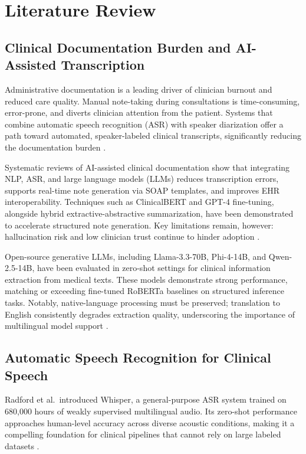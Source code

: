 \section{Literature Review}

\subsection{Clinical Documentation Burden and AI-Assisted Transcription}
Administrative documentation is a leading driver of clinician burnout and reduced care quality. Manual note-taking during consultations is time-consuming, error-prone, and diverts clinician attention from the patient. Systems that combine automatic speech recognition (ASR) with speaker diarization offer a path toward automated, speaker-labeled clinical transcripts, significantly reducing the documentation burden \cite{klusty2024clinical, saadat2025enhancing}.

Systematic reviews of AI-assisted clinical documentation show that integrating NLP, ASR, and large language models (LLMs) reduces transcription errors, supports real-time note generation via SOAP templates, and improves EHR interoperability. Techniques such as ClinicalBERT and GPT-4 fine-tuning, alongside hybrid extractive-abstractive summarization, have been demonstrated to accelerate structured note generation. Key limitations remain, however: hallucination risk and low clinician trust continue to hinder adoption \cite{saadat2025enhancing}.

Open-source generative LLMs, including Llama-3.3-70B, Phi-4-14B, and Qwen-2.5-14B, have been evaluated in zero-shot settings for clinical information extraction from medical texts. These models demonstrate strong performance, matching or exceeding fine-tuned RoBERTa baselines on structured inference tasks. Notably, native-language processing must be preserved; translation to English consistently degrades extraction quality, underscoring the importance of multilingual model support \cite{builtjes2025leveraging}.

\subsection{Automatic Speech Recognition for Clinical Speech}
Radford et al.\ introduced Whisper, a general-purpose ASR system trained on 680,000 hours of weakly supervised multilingual audio. Its zero-shot performance approaches human-level accuracy across diverse acoustic conditions, making it a compelling foundation for clinical pipelines that cannot rely on large labeled datasets \cite{radford2023whisper}.

